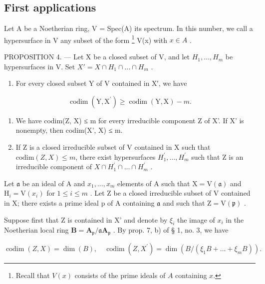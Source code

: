 \subsection{First applications}

Let A be a Noetherian ring, V = Spec(A) its spectrum. In this number, we call a hypersurface in V any subset of the form \footnote{Recall that \(V(x)\) consists of the prime ideals of \(A\) containing \(x\).} V(x) with \(x \in A\) .

PROPOSITION 4. --- Let X be a closed subset of V, and let \(H_{1}, \ldots, H_{m}\) be hypersurfaces in V. Set \(X' = X \cap H_{1} \cap \ldots \cap H_{m}\) .

\begin{enumerate}
\def\labelenumi{\alph{enumi})}
\tightlist
\item
  For every closed subset Y of V contained in X′, we have
\end{enumerate}

\[
\operatorname{codim} (\mathrm{Y}, \mathrm{X} ^ {\prime}) \geqslant \operatorname{codim} (\mathrm{Y}, \mathrm{X}) - m.
\]

\begin{enumerate}
\def\labelenumi{\alph{enumi})}
\setcounter{enumi}{1}
\item
  We have codim(Z, X) ≤ m for every irreducible component Z of X'. If X' is nonempty, then codim(X', X) ≤ m.
\item
  If Z is a closed irreducible subset of V contained in X such that \(\text{codim}(Z, X) \leqslant m\), there exist hypersurfaces \(H_{1}^{\prime}, \ldots, H_{m}^{\prime}\) such that Z is an irreducible component of \(X \cap H_{1}^{\prime} \cap \ldots \cap H_{m}^{\prime}\) .
\end{enumerate}

Let \(\mathfrak{a}\) be an ideal of A and \(x_{1},\ldots,x_{m}\) elements of A such that \(\mathrm{X}=\mathrm{V}(\mathfrak{a})\) and \(\mathrm{H}_{i}=\mathrm{V}(x_{i})\) for \(1\leqslant i\leqslant m\) . Let Z be a closed irreducible subset of V contained in X; there exists a prime ideal p of A containing \(\mathfrak{a}\) and such that \(\mathrm{Z}=\mathrm{V}(\mathfrak{p})\) .

Suppose first that Z is contained in X' and denote by \(\xi_{i}\) the image of \(x_{i}\) in the Noetherian local ring \(\mathbf{B} = \mathbf{A}_{\mathfrak{p}} / \mathfrak{a}\mathbf{A}_{\mathfrak{p}}\) . By prop. 7, b) of § 1, no. 3, we have

\[
\operatorname{codim} (Z, X) = \dim (B), \quad \operatorname{codim} (Z, X ^ {\prime}) = \dim (B / (\xi_ {1} B + \dots + \xi_ {m} B)).
\]

